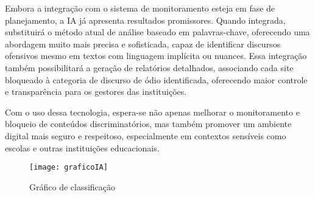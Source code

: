 Embora a integração com o sistema de monitoramento esteja em fase de planejamento, a IA já apresenta resultados promissores. Quando integrada, substituirá o método atual de análise baseado em palavras-chave, oferecendo uma abordagem muito mais precisa e sofisticada, capaz de identificar discursos ofensivos mesmo em textos com linguagem implícita ou nuances. Essa integração também possibilitará a geração de relatórios detalhados, associando cada site bloqueado à categoria de discurso de ódio identificada, oferecendo maior controle e transparência para os gestores das instituições.

Com o uso dessa tecnologia, espera-se não apenas melhorar o monitoramento e bloqueio de conteúdos discriminatórios, mas também promover um ambiente digital mais seguro e respeitoso, especialmente em contextos sensíveis como escolas e outras instituições educacionais.

\begin{figure}[H]
    \centering
    \caption{Gráfico de classificação}%
    \label{fig:ia}
    \texttt{[image: graficoIA]}
    \end{figure}